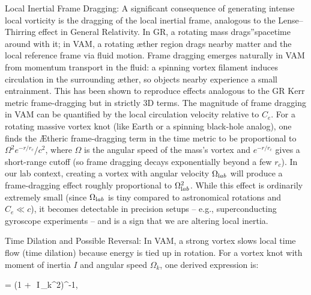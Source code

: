 Local Inertial Frame Dragging: A significant consequence of generating intense local vorticity is the dragging of the local inertial frame, analogous to the Lense–Thirring effect in General Relativity. In GR, a rotating mass \grqq drags\textquotedblright spacetime around with it; in VAM, a rotating æther region drags nearby matter and the local reference frame via fluid motion. Frame dragging emerges naturally in VAM from momentum transport in the fluid: a spinning vortex filament induces circulation in the surrounding æther, so objects nearby experience a small entrainment. This has been shown to reproduce effects analogous to the GR Kerr metric frame-dragging but in strictly 3D terms. The magnitude of frame dragging in VAM can be quantified by the local circulation velocity relative to $C_e$. For a rotating massive vortex knot (like Earth or a spinning black-hole analog), one finds the Ætheric frame-dragging term in the time metric to be proportional to $\Omega^2 e^{-r/r_c}/c^2$, where $\Omega$ is the angular speed of the mass's vortex and $e^{-r/r_c}$ gives a short-range cutoff (so frame dragging decays exponentially beyond a few $r_c$). In our lab context, creating a vortex with angular velocity $\Omega_{\textrm lab}$ will produce a frame-dragging effect roughly proportional to $\Omega_{\textrm lab}^2$. While this effect is ordinarily extremely small (since $\Omega_{\textrm lab}$ is tiny compared to astronomical rotations and $C_e \ll c$), it becomes detectable in precision setups – e.g., superconducting gyroscope experiments – and is a sign that we are altering local inertia.


Time Dilation and Possible Reversal: In VAM, a strong vortex slows local time flow (time dilation) because energy is tied up in rotation. For a vortex knot with moment of inertia $I$ and angular speed $\Omega_k$, one derived expression is:


 \;=\; \Big(1 + \,\beta\,I\,\Omega_k^2\Big)^{-1}, \label{eq:timedil}


